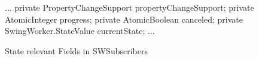 \begin{figure}[h]
\begin{sourcecode}
\begin{javacode}{}
...
	private PropertyChangeSupport propertyChangeSupport;
	private AtomicInteger progress;
	private AtomicBoolean canceled;
	private SwingWorker.StateValue currentState;
...
\end{javacode}
\caption{State relevant Fields in SWSubscribers}
\label{code:swsubscriber-state-relevant-fields}
\end{sourcecode}
\end{figure}